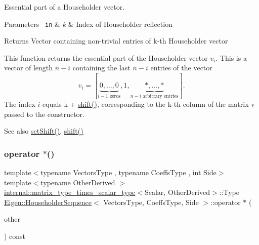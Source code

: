 Essential part of a Householder vector. 


\begin{DoxyParams}[1]{Parameters}
\mbox{\texttt{ in}}  & {\em k} & Index of Householder reflection \\
\hline
\end{DoxyParams}
\begin{DoxyReturn}{Returns}
Vector containing non-\/trivial entries of k-\/th Householder vector
\end{DoxyReturn}
This function returns the essential part of the Householder vector $ v_i $. This is a vector of length $ n-i $ containing the last $ n-i $ entries of the vector \[ v_i = [\underbrace{0, \ldots, 0}_{i-1\mbox{ zeros}}, 1, \underbrace{*, \ldots,*}_{n-i\mbox{ arbitrary entries}} ]. \] The index $ i $ equals {\ttfamily k} + \mbox{\hyperlink{class_eigen_1_1_householder_sequence_a34482bfad5563fd8a8a4264db76ac917}{shift()}}, corresponding to the k-\/th column of the matrix {\ttfamily v} passed to the constructor.

\begin{DoxySeeAlso}{See also}
\mbox{\hyperlink{class_eigen_1_1_householder_sequence_a2d8d996ce1085fd977850988735739f0}{set\+Shift()}}, \mbox{\hyperlink{class_eigen_1_1_householder_sequence_a34482bfad5563fd8a8a4264db76ac917}{shift()}} 
\end{DoxySeeAlso}
\mbox{\label{class_eigen_1_1_householder_sequence_a8d1636f2dfa948d640256c3331d21357}} 
\subsubsection{\texorpdfstring{operator $\ast$()}{operator *()}}
{\footnotesize\ttfamily template$<$typename Vectors\+Type , typename Coeffs\+Type , int Side$>$ \\
template$<$typename Other\+Derived $>$ \\
\mbox{\hyperlink{struct_eigen_1_1internal_1_1matrix__type__times__scalar__type}{internal\+::matrix\+\_\+type\+\_\+times\+\_\+scalar\+\_\+type}}$<$Scalar, Other\+Derived$>$\+::Type \mbox{\hyperlink{class_eigen_1_1_householder_sequence}{Eigen\+::\+Householder\+Sequence}}$<$ Vectors\+Type, Coeffs\+Type, Side $>$\+::operator $\ast$ (\begin{DoxyParamCaption}\item[{const \mbox{\hyperlink{class_eigen_1_1_matrix_base}{Matrix\+Base}}$<$ Other\+Derived $>$ \&}]{other }\end{DoxyParamCaption}) const\hspace{0.3cm}{\ttfamily [inline]}}



